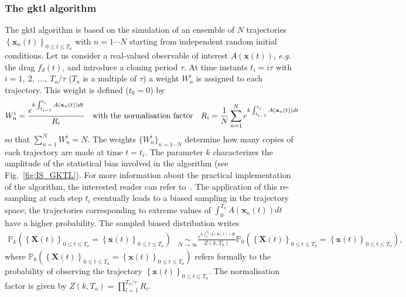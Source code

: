 \documentclass[pre,aps,floatfix,10pt,superscriptaddress, notitlepage,preprint]{revtex4-1}
\begin{document}
\subsubsection{The \ac{gktl} algorithm}
\label{sec:gktl_description}
The \ac{gktl} algorithm is based on the simulation of an ensemble of $N$ trajectories $\left\{\mathbf{x}_{n}(t)\right\}_{0\leq t \leq T_a}$ with $ n =1 \cdots N$ starting from independent random initial conditions.
%
Let us consider a real-valued observable of interest $A(\mathbf{x}(t))$, {\emph{e.g.} the drag $f_d(t)$}, and introduce a cloning period $\tau$.
%
At time instants $t_{i}=i\tau$ with $i=1,~2,~...,~T_{a}/\tau$ ($T_{a}$ is a multiple of $\tau$) a weight $W_{n}^{i}$ is assigned to each trajectory. This weight is defined ($t_0=0$) by
%
\begin{equation}
W_{n}^{i}=\frac{e^{k\intop_{t_{i-1}}^{t_{i}}A(\mathbf{x}_{n}(t))dt}}{R_{i}}\quad \mbox{with the normalisation factor} \quad R_{i}=\frac{1}{N}\sum_{n=1}^{N}e^{k\int_{t_{i-1}}^{t_{i}}A(\mathbf{x}_{n}(t))dt}
\label{eq:Weight}
\end{equation}
so that $\sum_{n=1}^N W_n^i = N$.
%
%
{The weights $\{W_{n}^{i}\}_{n=1\cdots N}$ determine how many copies of each trajectory are made at time $t=t_i$. The parameter $k$ characterizes the amplitude of the statistical bias involved in the algorithm (see Fig.~\ref{fig:IS_GKTL}). For more information about the practical implementation of the algorithm, the interested reader can refer to~\cite{brewer2018efficient, lestang:tel-01974316}}.
The application of this re-sampling at each step $t_i$ eventually leads to a biased sampling in the trajectory space; the trajectories corresponding to extreme values of $\int_{0}^{T_a}A(\mathbf{x}_{n}(t))dt$ have a higher probability.
%
The sampled biased distribution writes
%
\begin{align}
\mathbb{P}_{k}\left(\left\{ \mathbf{X}(t)\right\} _{0\leq t\leq T_{a}}=\left\{ \mathbf{x}(t)\right\} _{0\leq t\leq T_{a}}\right) &\underset{N\rightarrow\infty}{\sim} \frac{e^{k\int_{0}^{T_{a}}A(\mathbf{x}(t))dt}}{Z(k,T_a)}\mathbb{\mathbb{P}}_{0}\left(\left\{ \mathbf{X}(t)\right\} _{0\leq t\leq T_{a}}=\left\{ \mathbf{x}(t)\right\} _{0\leq t\leq T_{a}}\right),
\label{eq:Biased_Path_Approximation}
\end{align}
where
$\mathbb{P}_{0}\left(\left\{ \mathbf{X}(t)\right\} _{0\leq t\leq T_{a}} = \left\{ \mathbf{x}(t)\right\} _{0\leq t\leq T_{a}}\right)$ 
refers formally to the probability of observing the trajectory 
$\left\{ \mathbf{x}(t)\right\} _{0\leq t\leq T_{a}}$.
The normalisation factor is given by $Z(k,T_a)=\prod_{i=1}^{T_a/\tau}R_i$.
\end{document}

